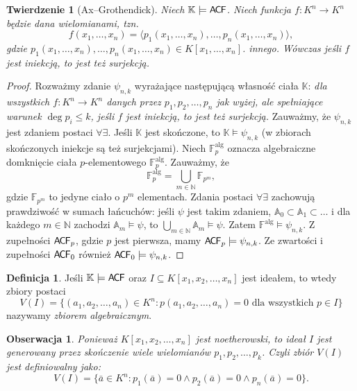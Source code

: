 \documentclass{article}
\newcommand{\N}{\mathbb{N}}
\newcommand{\A}{\mathbb{A}}
\newcommand{\F}{\mathbb{F}}
\newcommand{\K}{\mathbb{K}}
\theoremstyle{plain}
\newtheorem{tw}[thm]{Twierdzenie}
\newtheorem{obs}[thm]{Obserwacja}
\theoremstyle{definition}
\newtheorem{df}[thm]{Definicja}
\theoremstyle{remark}
\newcommand{\ACF}{\mathsf{A \mkern-2.0mu C \mkern-1.1mu F}}
\begin{document}
\begin{tw}[Ax--Grothendick]
	Niech $\mathbb{K} \models \ACF$.
	Niech funkcja $f \colon K^n \rightarrow K^n$ będzie dana wielomianami,
	tzn. $$f(x_1, \ldots, x_n) = \langle p_1(x_1, \ldots, x_n), \ldots,
	p_n(x_1, \ldots, x_n)\rangle ,$$ gdzie $p_1(x_1, \ldots, x_n), \ldots,
	p_n(x_1, \ldots, x_n) \in K[x_1, \ldots, x_n]$.
	innego.
	Wówczas jeśli $f$ jest iniekcją, to jest też surjekcją.
\end{tw}
\begin{proof}
	Rozważmy zdanie $\psi_{n,k}$ wyrażające następującą własność ciała $\K$:
	\textit{dla wszystkich $f \colon K^n \rightarrow K^n$ danych przez
	$p_1, p_2, \ldots, p_n$ jak wyżej, ale spełniające warunek $\deg p_i
	\leq k$, jeśli $f$ jest iniekcją, to jest też surjekcją. }
	Zauważmy, że $\psi_{n,k}$ jest zdaniem postaci $\forall \exists$.
	Jeśli $\K$ jest skończone, to $\K \models \psi_{n,k}$ (w zbiorach
	skończonych iniekcje są też surjekcjami). %
	Niech $\F^{\text{alg}}_{p}$ oznacza algebraiczne domknięcie ciała
	$p$-elementowego $\F^{\text{alg}}_p$.
	Zauważmy, że $$\F^{\text{alg}}_{p} = \bigcup_{m \in \N} \F_{p^m},$$
	gdzie $\F_{p^m}$ to jedyne ciało o $p^m$ elementach.
	Zdania postaci $\forall \exists$ zachowują prawdziwość w sumach łańcuchów:
	jeśli $\psi$ jest takim zdaniem, $\A_0 \subset \A_1 \subset \ldots $ i
	dla każdego $m \in \N$ zachodzi
	$\A_m \models \psi$, to $\bigcup_{m \in \N} \A_m \models \psi$.
	Zatem $\F^{\text{alg}} \models \psi_{n,k}$. %
	Z zupełności $\ACF_p$, gdzie $p$ jest pierwsza, mamy
	$\ACF_p \models \psi_{n,k}$.
	Ze zwartości i zupełności $\ACF_0$ również $\ACF_0 \models \psi_{n,k}$.

\end{proof}

\begin{df}
	Jeśli $\K \models \ACF$ oraz $I \subseteq K[x_1, x_2, \ldots, x_n ]$
	jest ideałem, to wtedy zbiory postaci $$V(I) = \{(a_1, a_2, \ldots,
	a_n) \in K^n \colon p( a_1, a_2, \ldots, a_n ) = 0 \text{ dla
	wszystkich } p \in I\}$$ nazywamy \textit{zbiorem algebraicznym}.
\end{df}


\begin{obs}
	Ponieważ $K[x_1, x_2, \ldots, x_n ]$ jest noetherowski, to ideał $I$
	jest generowany przez skończenie wiele wielomianów
	$p_1, p_2, \ldots, p_k$.
	Czyli zbiór $V(I)$ jest definiowalny jako:
	$$V(I) = \{ \bar{a} \in K^n \colon p_1(\bar{a}) = 0 \wedge p_2(\bar{a}) = 0 \wedge p_n(\bar{a})=0 \}.$$
\end{obs}
\end{document}
